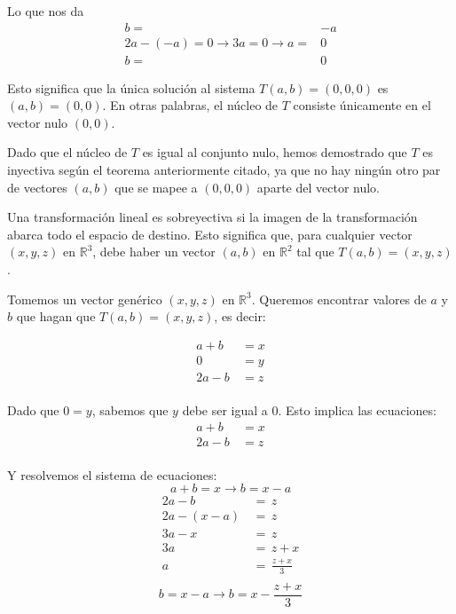 \begin{enumerate}
      Lo que nos da 
      \begin{align*}
            b = & -a \\
            2a -(-a) = 0 \rightarrow 3a = 0 \rightarrow a = &  0 \\
            b = & 0
      \end{align*}

      Esto significa que la única solución al sistema \(T(a,b) = (0,0,0)\) es \((a,b) = (0,0)\). En otras palabras, el núcleo de \(T\) consiste únicamente en el vector nulo \((0,0)\).

      Dado que el núcleo de \(T\) es igual al conjunto nulo, hemos demostrado que \(T\) es inyectiva según el teorema anteriormente citado, ya que no hay ningún otro par de vectores \((a,b)\) que se mapee a \((0,0,0)\) aparte del vector nulo.

      Una transformación lineal es sobreyectiva si la imagen de la transformación abarca todo el espacio de destino. Esto significa que, para cualquier vector \((x, y, z)\) en \(\mathbb{R}^3\), debe haber un vector \((a, b)\) en \(\mathbb{R}^2\) tal que \(T(a, b) = (x, y, z)\).

      Tomemos un vector genérico \((x, y, z)\) en \(\mathbb{R}^3\). Queremos encontrar valores de \(a\) y \(b\) que hagan que \(T(a, b) = (x, y, z)\), es decir:

      \begin{align*}
            a + b & \, = x \\
                0 & \, = y \\
            2a - b& \, = z \\
      \end{align*}

      Dado que $0 = y$, sabemos que $y$ debe ser igual a 0. Esto implica las ecuaciones:
      \begin{align*}
            a + b & \, = x \\
            2a - b& \, = z \\
      \end{align*}

      Y resolvemos el sistema de ecuaciones:
      \begin{equation*}
            a + b = x \rightarrow b = x - a
      \end{equation*}
      \begin{align*}
            2a - b & \, = \, z \\
            2a - (x - a) & \, = \, z \\
            3a - x & \, = \, z \\
            3a  & \, = \, z + x \\
            a & \, = \, \frac{z + x}{3} \\
      \end{align*}
      \begin{equation*}
            b = x - a \rightarrow b = x - \frac{z+x}{3}
      \end{equation*}


\end{enumerate}
